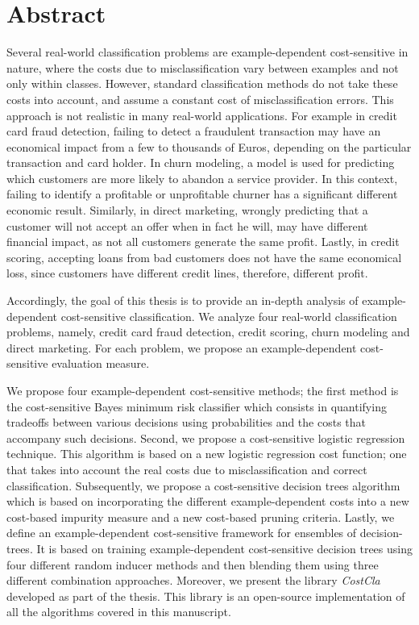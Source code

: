 \chapter*{Abstract}

Several real-world classification problems are example-dependent cost-sensitive in nature, where the 
costs due to misclassification vary between examples and not only within classes. However, standard 
classification methods do not take these costs into account, and assume a constant cost of 
misclassification errors. This approach is not realistic in many real-world applications. For  
example in credit card fraud detection, failing to detect a fraudulent transaction may have an 
economical impact from a few to thousands of Euros, depending on the particular transaction and card 
holder. In churn modeling, a model is used for predicting which customers are more likely to 
abandon a service provider. In this context, failing to identify a   profitable or unprofitable 
churner has a significant different economic   result. Similarly, in direct marketing, wrongly 
predicting that a customer   will not accept an offer when in fact he will, may have different 
financial impact, as not all   customers generate the same profit. Lastly, in credit scoring, 
accepting   loans from bad customers does not have the same economical loss, since customers have 
different   credit lines, therefore, different profit.

Accordingly, the goal of this thesis is to provide an in-depth analysis of example-dependent 
cost-sensitive classification. We analyze four real-world classification problems, namely, 
credit card fraud detection, credit scoring, churn modeling and direct marketing. For each problem, 
we propose an example-dependent cost-sensitive evaluation measure.

We propose four example-dependent cost-sensitive methods; the first method is the cost-sensitive 
Bayes minimum risk classifier which consists in quantifying tradeoffs between various decisions 
using probabilities and the costs that accompany such decisions. Second, we propose a
cost-sensitive logistic regression technique. This algorithm is based on a new logistic regression 
cost function; one that takes into account the real costs due to misclassification and correct 
classification. Subsequently, we propose a cost-sensitive decision trees algorithm which is based 
on incorporating the different example-dependent costs into a new cost-based impurity measure and a 
new cost-based pruning criteria. Lastly, we define an example-dependent cost-sensitive framework 
for ensembles of decision-trees. It is based on training example-dependent cost-sensitive 
decision trees using four different random inducer methods and then blending them using three 
different combination approaches. Moreover, we present the library \mbox{\textit{CostCla}} developed 
as part of the thesis. This library is an open-source implementation of all the algorithms covered 
in this manuscript.

